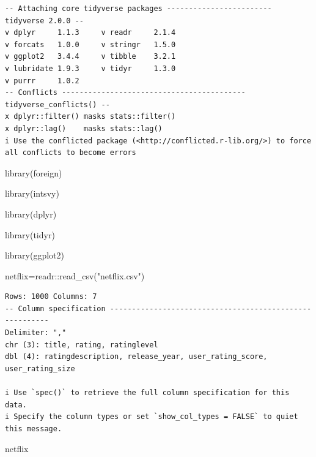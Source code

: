 \documentclass[
  letterpaper,
  DIV=11,
  numbers=noendperiod]{scrreprt}
\newenvironment{Shaded}{\begin{snugshade}}{\end{snugshade}}
\newcommand{\FunctionTok}[1]{\textcolor[rgb]{0.28,0.35,0.67}{#1}}
\newcommand{\NormalTok}[1]{\textcolor[rgb]{0.00,0.23,0.31}{#1}}
\newcommand{\OtherTok}[1]{\textcolor[rgb]{0.00,0.23,0.31}{#1}}
\newcommand{\SpecialCharTok}[1]{\textcolor[rgb]{0.37,0.37,0.37}{#1}}
\newcommand{\StringTok}[1]{\textcolor[rgb]{0.13,0.47,0.30}{#1}}
\begin{document}
\begin{verbatim}
-- Attaching core tidyverse packages ------------------------ tidyverse 2.0.0 --
v dplyr     1.1.3     v readr     2.1.4
v forcats   1.0.0     v stringr   1.5.0
v ggplot2   3.4.4     v tibble    3.2.1
v lubridate 1.9.3     v tidyr     1.3.0
v purrr     1.0.2     
-- Conflicts ------------------------------------------ tidyverse_conflicts() --
x dplyr::filter() masks stats::filter()
x dplyr::lag()    masks stats::lag()
i Use the conflicted package (<http://conflicted.r-lib.org/>) to force all conflicts to become errors
\end{verbatim}

\begin{Shaded}
\begin{Highlighting}[]
\FunctionTok{library}\NormalTok{(foreign)}

\FunctionTok{library}\NormalTok{(intsvy)}

\FunctionTok{library}\NormalTok{(dplyr)}

\FunctionTok{library}\NormalTok{(tidyr)}

\FunctionTok{library}\NormalTok{(ggplot2)}
\end{Highlighting}
\end{Shaded}

\begin{Shaded}
\begin{Highlighting}[]
\NormalTok{netflix}\OtherTok{=}\NormalTok{readr}\SpecialCharTok{::}\FunctionTok{read\_csv}\NormalTok{(}\StringTok{"netflix.csv"}\NormalTok{)}
\end{Highlighting}
\end{Shaded}

\begin{verbatim}
Rows: 1000 Columns: 7
-- Column specification --------------------------------------------------------
Delimiter: ","
chr (3): title, rating, ratinglevel
dbl (4): ratingdescription, release_year, user_rating_score, user_rating_size

i Use `spec()` to retrieve the full column specification for this data.
i Specify the column types or set `show_col_types = FALSE` to quiet this message.
\end{verbatim}

\begin{Shaded}
\begin{Highlighting}[]
\NormalTok{netflix}
\end{Highlighting}
\end{Shaded}
\end{document}
